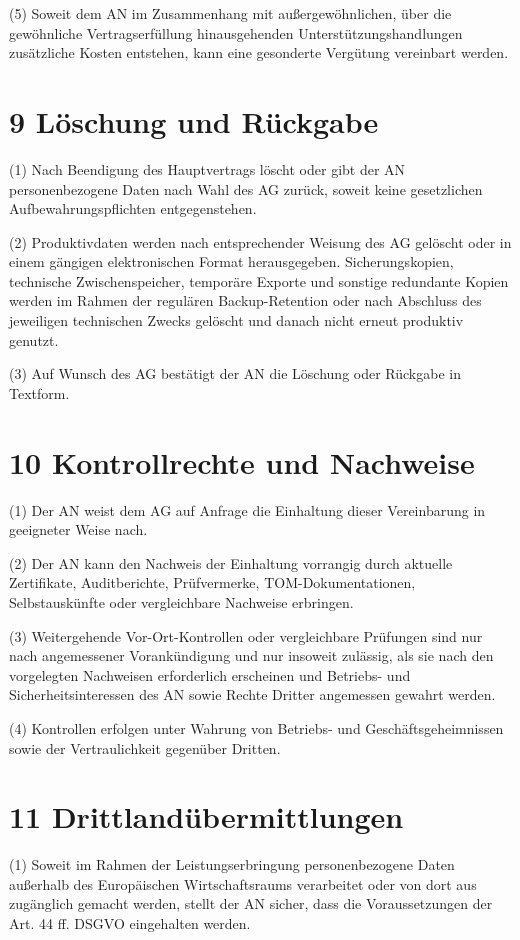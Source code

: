\documentclass[11pt,a4paper]{article}
\begin{document}
(5) Soweit dem AN im Zusammenhang mit außergewöhnlichen, über die gewöhnliche Vertragserfüllung hinausgehenden Unterstützungshandlungen zusätzliche Kosten entstehen, kann eine gesonderte Vergütung vereinbart werden.

\section*{9 Löschung und Rückgabe}
(1) Nach Beendigung des Hauptvertrags löscht oder gibt der AN personenbezogene Daten nach Wahl des AG zurück, soweit keine gesetzlichen Aufbewahrungspflichten entgegenstehen.

(2) Produktivdaten werden nach entsprechender Weisung des AG gelöscht oder in einem gängigen elektronischen Format herausgegeben. Sicherungskopien, technische Zwischenspeicher, temporäre Exporte und sonstige redundante Kopien werden im Rahmen der regulären Backup-Retention oder nach Abschluss des jeweiligen technischen Zwecks gelöscht und danach nicht erneut produktiv genutzt.

(3) Auf Wunsch des AG bestätigt der AN die Löschung oder Rückgabe in Textform.

\section*{10 Kontrollrechte und Nachweise}
(1) Der AN weist dem AG auf Anfrage die Einhaltung dieser Vereinbarung in geeigneter Weise nach.

(2) Der AN kann den Nachweis der Einhaltung vorrangig durch aktuelle Zertifikate, Auditberichte, Prüfvermerke, TOM-Dokumentationen, Selbstauskünfte oder vergleichbare Nachweise erbringen.

(3) Weitergehende Vor-Ort-Kontrollen oder vergleichbare Prüfungen sind nur nach angemessener Vorankündigung und nur insoweit zulässig, als sie nach den vorgelegten Nachweisen erforderlich erscheinen und Betriebs- und Sicherheitsinteressen des AN sowie Rechte Dritter angemessen gewahrt werden.

(4) Kontrollen erfolgen unter Wahrung von Betriebs- und Geschäftsgeheimnissen sowie der Vertraulichkeit gegenüber Dritten.

\section*{11 Drittlandübermittlungen}
(1) Soweit im Rahmen der Leistungserbringung personenbezogene Daten außerhalb des Europäischen Wirtschaftsraums verarbeitet oder von dort aus zugänglich gemacht werden, stellt der AN sicher, dass die Voraussetzungen der Art. 44 ff. DSGVO eingehalten werden.
\end{document}
